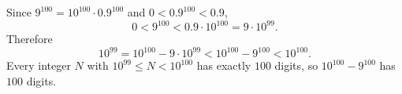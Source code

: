 Since $9^{100}=10^{100}\cdot0.9^{100}$ and $0<0.9^{100}<0.9$,
\[0<9^{100}<0.9\cdot10^{100}=9\cdot10^{99}.\]
Therefore
\[10^{99}=10^{100}-9\cdot10^{99}<10^{100}-9^{100}<10^{100}.\]
Every integer $N$ with $10^{99}\le N<10^{100}$ has exactly $100$ digits, so $10^{100}-9^{100}$ has $\boxed{100}$ digits.
